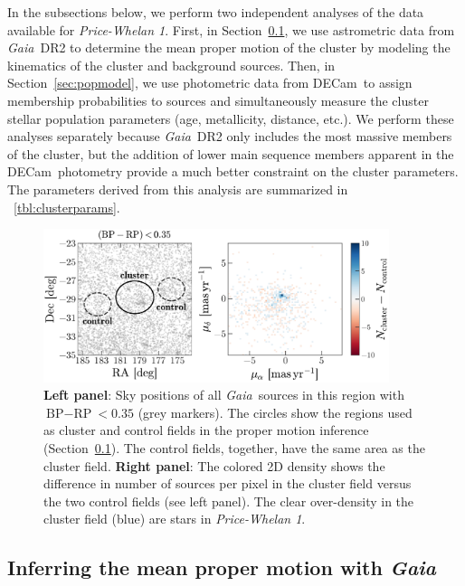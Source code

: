 \documentclass[twocolumn]{aastex62}
\newcommand{\acronym}[1]{{\small{#1}}}
\newcommand{\gaia}{\textsl{Gaia}}
\newcommand{\decam}{DECam}
\newcommand{\DR}[1]{\acronym{DR#1}}
\newcommand{\sectionname}{Section}
\newcommand{\clustername}{\textsl{Price-Whelan 1}}
\newcommand{\bprp}{\ensuremath{\textrm{BP} - \textrm{RP}}}
\begin{document}
In the subsections below, we perform two independent analyses of the data available for \clustername.
First, in \sectionname~\ref{sec:pmclean}, we use astrometric data from \gaia\ \DR{2} to determine the mean proper motion of the cluster by modeling the kinematics of the cluster and background sources.
Then, in \sectionname~\ref{sec:popmodel}, we use photometric data from \decam\ to assign membership probabilities to sources and simultaneously measure the cluster stellar population parameters (age, metallicity, distance, etc.).
We perform these analyses separately because \gaia\ \DR{2} only includes the most massive members of the cluster, but the addition of lower main sequence members apparent in the \decam\ photometry provide a much better constraint on the cluster parameters.
The parameters derived from this analysis are summarized in \tablename~\ref{tbl:clusterparams}.


\begin{figure}[t!]
\centering
\includegraphics[width=0.9\textwidth]{figures/pm-model.pdf}
\caption{\textbf{Left panel}: Sky positions of all \gaia\ sources in this region with $\bprp < 0.35$ (grey markers).
The circles show the regions used as cluster and control fields in the proper motion inference (\sectionname~\ref{sec:pmclean}).
The control fields, together, have the same area as the cluster field.
\textbf{Right panel}: The colored 2D density shows the difference in number of sources per pixel in the cluster field versus the two control fields (see left panel).
The clear over-density in the cluster field (blue) are stars in \clustername.}
\label{fig:pm-members}
\end{figure}

\subsection{Inferring the mean proper motion with \gaia}
\label{sec:pmclean}
\end{document}
